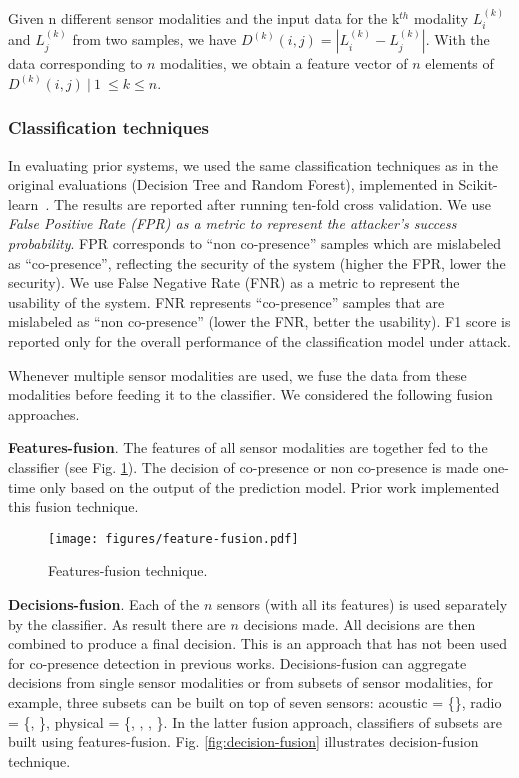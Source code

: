 {Given n different sensor modalities and the input data for the k$^{th}$ modality
$L_i^{(k)}$ and $L_j^{(k)}$ from
two samples, we have $D^{(k)}(i,j)=|L_i^{(k)}-L_j^{(k)}|$. With the 
data corresponding to $n$ modalities, we obtain a feature vector of
$n$ elements of $D^{(k)}(i, j)\ |\ 1\ \le k \le n$.


\subsubsection{Classification techniques}

In evaluating prior systems, we used the same classification techniques as
in the original evaluations (Decision Tree and Random Forest), implemented in
Scikit-learn~\cite{scikit-learn}. The results are reported after running
ten-fold cross validation. 
We use \textit{False Positive Rate (FPR) as a metric to 
represent the attacker's success probability}.  FPR corresponds to ``non
co-presence'' samples which are mislabeled as ``co-presence'', reflecting the
security of the system (higher the FPR, lower the security).  We use False
Negative Rate (FNR) as a metric to represent the usability of the system. FNR
represents ``co-presence'' samples that are mislabeled as ``non co-presence''
(lower the FNR, better the usability).  F1 score is reported only for the
overall performance of the classification model under \zeromodal attack.



Whenever multiple sensor modalities are used, we fuse the data from these
modalities before feeding it to the classifier. We considered the following
fusion approaches.



\textbf{Features-fusion}. The features of all sensor modalities are together fed to the classifier (see Fig. \ref{fig:feature-fusion}). The
decision of co-presence or non co-presence is made one-time only based on the output of the prediction model. Prior work \cite{TruongPerCom14,ShresthaFC2014} implemented this fusion technique.

\begin{figure}[htpb] 
	\centering
	\texttt{[image: figures/feature-fusion.pdf]}
	\caption{Features-fusion technique.}
	\label{fig:feature-fusion}
\end{figure} 


\textbf{Decisions-fusion}. Each of the $n$ sensors (with all its features) is used separately by the
classifier. As result there are $n$ decisions made.  All decisions are then
combined to produce a final decision. This is an approach that has not been
used for co-presence detection in previous works. Decisions-fusion can
aggregate decisions from single sensor modalities or from subsets of sensor
modalities, for example, three subsets can be built on top of seven sensors:
acoustic = \{\audio\}, radio = \{\bluetooth, \wifi\}, physical = \{\altitude,
\gas, \humidity, \temperature\}. In the latter fusion approach, classifiers of
subsets are built using features-fusion. Fig. \ref{fig:decision-fusion} illustrates decision-fusion technique.

}
